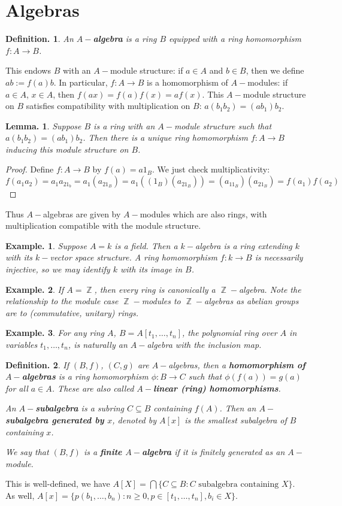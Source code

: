\documentclass[11pt, a4paper]{memoir}
\DeclareMathOperator{\Z}{{\mathbb{Z}}}
\newcommand{\mbf}[1]{{\boldmath\bfseries #1}}
\theoremstyle{change}
\newtheorem{lemma}[theorem]{Lemma.}
\theoremstyle{plain}
\theoremstyle{nonumberplain}
\newtheorem{definition}{Definition.}
\newtheorem{example}{Example.}
\newtheorem{proof}{Proof}
\numberwithin{equation}{section}
\begin{document}
\section{Algebras}
\begin{definition}
    An \mbf{$A-$algebra} is a ring $B$ equipped with a ring homomorphism $f:A\to B$.
\end{definition}
This endows $B$ with an $A-$module structure: if $a\in A$ and $b\in B$, then we define $ab:=f(a)b$.
In particular, $f:A\to B$ is a homomorphism of $A-$modules: if $a\in A$, $x\in A$, then $f(ax)=f(a)f(x)=af(x)$.
This $A-$module structure on $B$ satisfies compatibility with multiplication on $B$: $a(b_1b_2)=(ab_1)b_2$.
\begin{lemma}
    Suppose $B$ is a ring with an $A-$module structure such that $a(b_1b_2)=(ab_1)b_2$.
    Then there is a unique ring homomorphism $f:A\to B$ inducing this module structure on $B$.
\end{lemma}
\begin{proof}
    Define $f:A\to B$ by $f(a)=a1_B$.
    We just check multiplicativity:
    \begin{equation*}
        f(a_1a_2)=a_1a_21_b=a_1(a_21_B)=a_1((1_B)(a_21_B))=(a_11_B)(a_21_B)=f(a_1)f(a_2)
    \end{equation*}
\end{proof}
Thus $A-$algebras are given by $A-$modules which are also rings, with multiplication compatible with the module structure.
\begin{example}
    Suppose $A=k$ is a field.
    Then a $k-$algebra is a ring extending $k$ with its $k-$vector space structure.
    A ring homomorphism $f:k\to B$ is necessarily injective, so we may identify $k$ with its image in $B$.
\end{example}
\begin{example}
    If $A=\Z$, then every ring is canonically a $\Z-$algebra.
    Note the relationship to the module case $\Z-$modules to $\Z-$algebras as abelian groups are to (commutative, unitary) rings.
\end{example}
\begin{example}
    For any ring $A$, $B=A[t_1,\ldots,t_n]$, the polynomial ring over $A$ in variables $t_1,\ldots,t_n$, is naturally an $A-$algebra with the inclusion map.
\end{example}

\begin{definition}
    If $(B,f)$, $(C,g)$ are $A-$algebras, then a \mbf{homomorphism of $A-$algebras} is a ring homomorphism $\phi:B\to C$ such that $\phi(f(a))=g(a)$ for all $a\in A$.
    These are also called \mbf{$A-$linear (ring) homomorphisms}.

    An \mbf{$A-$subalgebra} is a subring $C\subseteq B$ containing $f(A)$.
    Then an \mbf{$A-$subalgebra generated by $x$}, denoted by $A[x]$ is the smallest subalgebra of $B$ containing $x$.

    We say that $(B,f)$ is a \mbf{finite $A-$algebra} if it is finitely generated as an $A-$module.
\end{definition}
This is well-defined, we have $A[X]=\bigcap\{C\subseteq B:C\text{ subalgebra containing $X$}\}$.
As well, $A[x]=\{p(b_1,\ldots,b_n):n\geq 0,p\in[t_1,\ldots,t_n],b_i\in X\}$.
\end{document}
